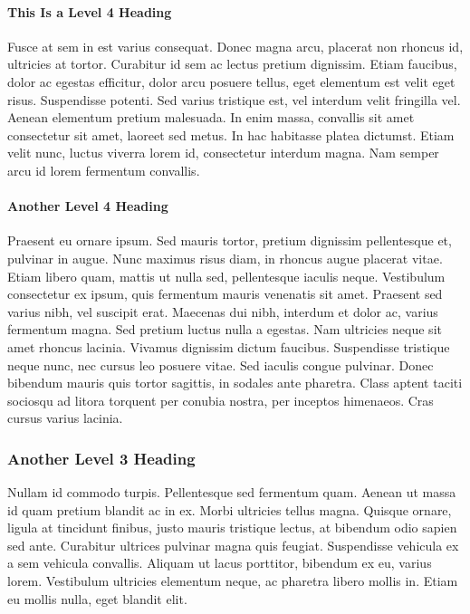 \documentclass[
    colorlinks=true,        %
    linkcolor=black,          %
    anchorcolor=black,      %
    citecolor=black,         %
    urlcolor=black,          %
    bookmarks=true,         %
    bookmarksopen=false,    %
    bookmarksnumbered=true,  %
    dvipsnames
]{MAE}
\begin{document}
\paragraph{This Is a Level 4 Heading}

Fusce at sem in est varius consequat. Donec magna arcu, placerat non rhoncus id, ultricies at tortor. Curabitur id sem ac lectus pretium dignissim. Etiam faucibus, dolor ac egestas efficitur, dolor arcu posuere tellus, eget elementum est velit eget risus. Suspendisse potenti. Sed varius tristique est, vel interdum velit fringilla vel. Aenean elementum pretium malesuada. In enim massa, convallis sit amet consectetur sit amet, laoreet sed metus. In hac habitasse platea dictumst. Etiam velit nunc, luctus viverra lorem id, consectetur interdum magna. Nam semper arcu id lorem fermentum convallis.

\paragraph{Another Level 4 Heading}

Praesent eu ornare ipsum. Sed mauris tortor, pretium dignissim pellentesque et, pulvinar in augue. Nunc maximus risus diam, in rhoncus augue placerat vitae. Etiam libero quam, mattis ut nulla sed, pellentesque iaculis neque. Vestibulum consectetur ex ipsum, quis fermentum mauris venenatis sit amet. Praesent sed varius nibh, vel suscipit erat. Maecenas dui nibh, interdum et dolor ac, varius fermentum magna. Sed pretium luctus nulla a egestas. Nam ultricies neque sit amet rhoncus lacinia. Vivamus dignissim dictum faucibus. Suspendisse tristique neque nunc, nec cursus leo posuere vitae. Sed iaculis congue pulvinar. Donec bibendum mauris quis tortor sagittis, in sodales ante pharetra. Class aptent taciti sociosqu ad litora torquent per conubia nostra, per inceptos himenaeos. Cras cursus varius lacinia.

\subsubsection{Another Level 3 Heading}

Nullam id commodo turpis. Pellentesque sed fermentum quam. Aenean ut massa id quam pretium blandit ac in ex. Morbi ultricies tellus magna. Quisque ornare, ligula at tincidunt finibus, justo mauris tristique lectus, at bibendum odio sapien sed ante. Curabitur ultrices pulvinar magna quis feugiat. Suspendisse vehicula ex a sem vehicula convallis. Aliquam ut lacus porttitor, bibendum ex eu, varius lorem. Vestibulum ultricies elementum neque, ac pharetra libero mollis in. Etiam eu mollis nulla, eget blandit elit.
\end{document}
